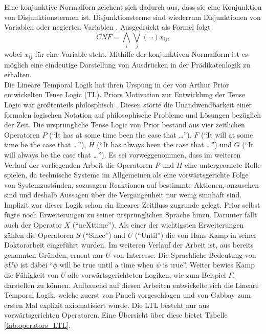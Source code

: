 Eine konjunktive Normalforn zeichent sich dadurch aus, dass sie eine Konjunktion von Disjunktionstermen ist. Disjunktionsterme sind wiederrum Disjunktionen von Variablen oder negierten Variablen \cite{BN77}. Ausgedrückt als Formel folgt
\begin{equation}
CNF = \bigwedge_{i} \bigvee_{j} (\lnot) x_{ij} \text{,}
\label{eq:CNF}
\end{equation}
wobei $x_{ij}$ für eine Variable steht. Mithilfe der konjunktiven Normalform ist es möglich eine eindeutige Darstellung von Ausdrücken in der Prädikatenlogik zu erhalten.\\

Die Lineare Temporal Logik hat ihren Urspung in der von Arthur Prior entwickelten Tense Logic (TL). Priors Motivation zur Entwicklung der Tense Logic war größtenteils philosphisch \cite{Zal17}. Diesen störte die Unandwendbarkeit einer formalen logischen Notation auf philosophische Probleme und Lösungen bezüglich der Zeit. Die ursprüngliche Tense Logic von Prior bestand aus vier zeitlichen Operatoren $P$ ("`It has at some time been the case that …"'), $F$ ("`It will at some time be the case that …"'), $H$ ("`It has always been the case that …"') und $G$ ("`It will always be the case that …"'). Es sei vorweggenommen, dass im weiteren Verlauf der vorliegenden Arbeit die Operatoren $P$ und $H$ eine untergeornete Rolle spielen, da technische Systeme im Allgemeinen als eine vorwärtsgerichte Folge von Systemzuständen, sozusagen Reaktionen auf bestimmte Aktionen, anzusehen sind und deshalb Aussagen über die Vergangenheit nur wenig sinnhaft sind. Implizit war dieser Logik schon ein linearer Zeitfluss zugrunde gelegt. Prior selbst fügte noch Erweiterungen zu seiner ursprünglichen Sprache hinzu. Darunter fällt auch der Operator $X$ ("`neXttime"'). Als einer der wichtigsten Erweiterungen zählen die Operatoren $S$ ("`Since"') and $U$ ("`Until"') die von Hans Kamp in seiner Doktorarbeit eingeführt wurden. Im weiteren Verlauf der Arbeit ist, aus bereits genannten Gründen, erneut nur $U$ von Interesse. Die Sprachliche Bedeutung von $\phi U \psi$ ist dabei "`$\phi \text{ will be true until a time when } \psi \text{ is true}$"'. Weiter bewies Kamp die Fähigkeit von $U$ alle vorwärtsgerichteten Logiken, wie zum Beispiel $F$, darstellen zu können. Aufbauend auf diesen Arbeiten entwickelte sich die Lineare Temporal Logik, welche zuerst von Pnueli vorgeschlagen und von Gabbay zum ersten Mal explizit axiomatisiert wurde. Die LTL besteht nur aus vorwärtsgerichten Operatoren. Eine Übersicht über diese bietet Tabelle \ref{tab:operators_LTL}.
